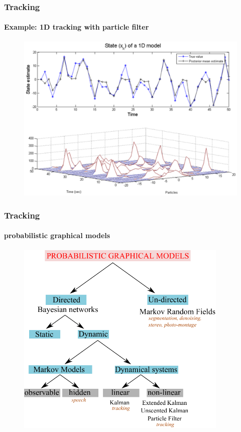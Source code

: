 \begin{frame}
\frametitle{Tracking}
\framesubtitle{Example: 1D tracking with particle filter}
\mypagenum
\begin{figure}
\includegraphics[width=1.0\textwidth]{thesis/TRK_ParticleFilter_multimodalPDF.pdf}
\end{figure}	
\end{frame}



\begin{frame}
\frametitle{Tracking}
\framesubtitle{probabilistic graphical models}
\mypagenum
	\begin{figure}
		\includegraphics[width=0.9\textwidth]{thesis/PRML_PGM_overview.pdf}
	\end{figure}
\end{frame}


